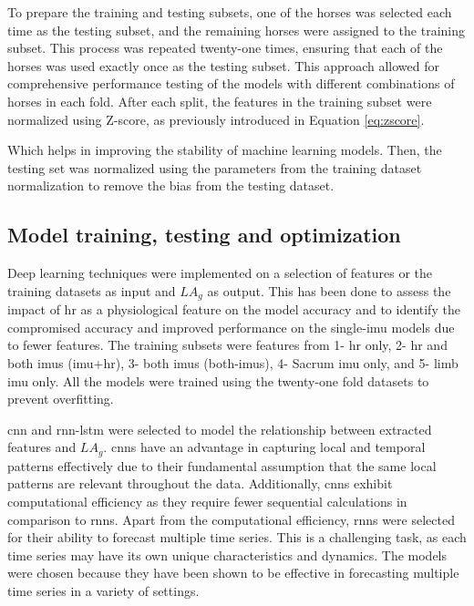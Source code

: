 To prepare the training and testing subsets, one of the horses was selected each time as the testing subset, and the remaining horses were assigned to the training subset. This process was repeated twenty-one times, ensuring that each of the horses was used exactly once as the testing subset. This approach allowed for comprehensive performance testing of the models with different combinations of horses in each fold. After each split, the features in the training subset were normalized using Z-score, as previously introduced in Equation \ref{eq:zscore}.

Which helps in improving the stability of machine learning models. Then, the testing set was normalized using the parameters from the training dataset normalization to remove the bias from the testing dataset. 

\subsection{Model training, testing and optimization}

Deep learning techniques were implemented on a selection of features or the training datasets as input and $LA_g$ as output. This has been done to assess the impact of \gls{hr} as a physiological feature on the model accuracy and to identify the compromised accuracy and improved performance on the single-\gls{imu} models due to fewer features. The training subsets were features from 1- \gls{hr} only, 2- \gls{hr} and both \gls{imu}s (\gls{imu}+\gls{hr}), 3- both \gls{imu}s (both-\gls{imu}s), 4- Sacrum \gls{imu} only, and 5- limb \gls{imu} only. All the models were trained using the twenty-one fold datasets to prevent overfitting.

\gls{cnn} and \gls{rnn}-\gls{lstm} were selected to model the relationship between extracted features and $LA_g$. \gls{cnn}s have an advantage in capturing local and temporal patterns effectively due to their fundamental assumption that the same local patterns are relevant throughout the data. Additionally, \gls{cnn}s exhibit computational efficiency as they require fewer sequential calculations in comparison to \gls{rnn}s. Apart from the computational efficiency, \gls{rnn}s were selected for their ability to forecast multiple time series. This is a challenging task, as each time series may have its own unique characteristics and dynamics. The models were chosen because they have been shown to be effective in forecasting multiple time series in a variety of settings. 

